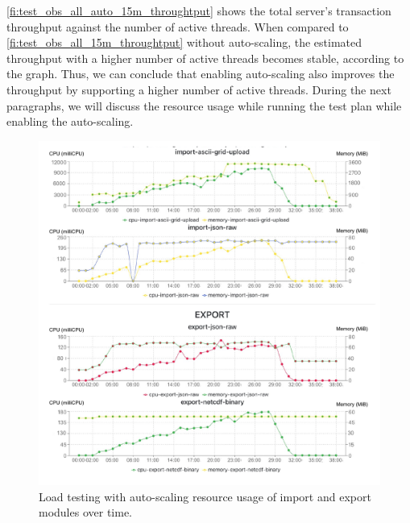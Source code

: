 \cref{fi:test_obs_all_auto_15m_throughtput} shows the total server's transaction throughput against the number of active threads. When compared to \cref{fi:test_obs_all_15m_throughtput} without auto-scaling, the estimated throughput with a higher number of active threads becomes stable, according to the graph. Thus, we can conclude that enabling auto-scaling also improves the throughput by supporting a higher number of active threads.  During the next paragraphs, we will discuss the resource usage while running the test plan while enabling the auto-scaling.

\begin{figure}[htp]
    \centering
    \includegraphics[width=1.0\textwidth]{results/obs/all_auto/obs_all_auto_15m_import_export_res.pdf}
    \caption{Load testing with auto-scaling resource usage of import and export modules over time.}
    \label{fi:obs_all_auto_15m_import_export_res}
\end{figure}

